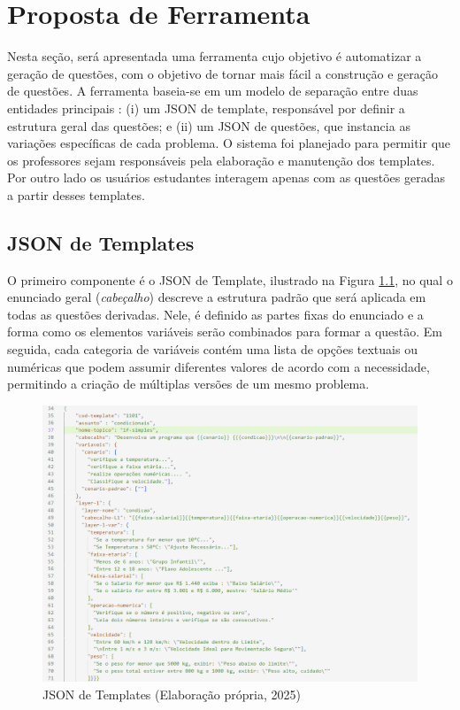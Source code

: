 \chapter{Proposta de Ferramenta}

Nesta seção, será apresentada uma ferramenta cujo objetivo é automatizar a geração de questões, com o objetivo de tornar mais fácil a construção e geração de questões. A ferramenta baseia-se em um modelo de separação entre duas entidades principais : (i) um JSON de template, responsável por definir a estrutura geral das questões; e (ii) um JSON de questões, que instancia as variações específicas de cada problema. O sistema foi planejado para permitir que os professores sejam responsáveis pela elaboração e manutenção dos templates. Por outro lado os usuários estudantes interagem apenas com as questões geradas a partir desses templates.

\section{JSON de Templates}

O primeiro componente é o JSON de Template, ilustrado na Figura \ref{fig:json-de-templates}, no qual o enunciado geral (\textit{cabeçalho}) descreve a estrutura padrão que será aplicada em todas as questões derivadas. Nele, é definido as partes fixas do enunciado e a forma como os elementos variáveis serão combinados para formar a questão. Em seguida, cada categoria de variáveis contém uma lista de opções textuais ou numéricas que podem assumir diferentes valores de acordo com a necessidade, permitindo a criação de múltiplas versões de um mesmo problema.


\begin{figure}[ht]
	\centering
	\includegraphics[width=16cm]{./imagens/capitulo7/json-de-template}
	\caption{JSON de Templates (Elaboração própria, 2025) }
	\label{fig:json-de-templates}
\end{figure}
